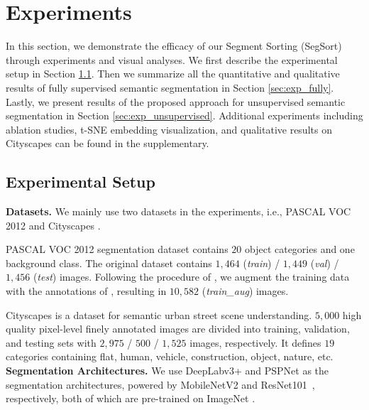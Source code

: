 \documentclass[10pt,twocolumn,letterpaper]{article}
\begin{document}
\section{Experiments}
\label{sec:exp}


In this section, we demonstrate the efficacy of our Segment Sorting (SegSort) through experiments and visual analyses. We first describe the experimental setup in Section \ref{sec:exp_setup}. Then we summarize all the quantitative and qualitative results of fully supervised semantic segmentation in Section \ref{sec:exp_fully}. Lastly, we present results of the proposed approach for unsupervised semantic segmentation in Section \ref{sec:exp_unsupervised}. Additional experiments including ablation studies, t-SNE embedding visualization, and qualitative results on Cityscapes can be found in the supplementary.


\subsection{Experimental Setup}
\label{sec:exp_setup}

\noindent \textbf{Datasets.} We mainly use two datasets in the experiments, i.e., 
PASCAL VOC 2012 \cite{pascal-voc-2012} and Cityscapes \cite{cordts2016cityscapes}. 

PASCAL VOC 2012 \cite{pascal-voc-2012} segmentation dataset contains $20$ object categories and one background class. The original dataset contains $1,464$ ({\it train}) / $1,449$ ({\it val}) / $1,456$ ({\it test}) images.  Following the procedure of \cite{long2015fully, chen2016deeplab,zhao2016pyramid}, we augment the training data with the annotations of \cite{hariharan2011semantic}, resulting in $10,582$ ({\it train\_aug}) images. 

Cityscapes \cite{cordts2016cityscapes} is a dataset for semantic urban street scene understanding.  $5,000$ high quality pixel-level finely annotated images are divided into  training, validation, and testing sets with $2,975$ / $500$ / $1,525$ images, respectively. It defines $19$ categories containing flat, human, vehicle, construction, object, nature, etc. \\

\vspace{-6pt}
\noindent \textbf{Segmentation Architectures.} We use DeepLabv3+ \cite{deeplabv3plus2018} and PSPNet \cite{zhao2016pyramid} as the segmentation architectures, powered by MobileNetV2 \cite{mobilenetv22018} and ResNet101~\cite{he2016deep}, respectively, both of which are pre-trained on ImageNet \cite{krizhevsky2012imagenet}.
\end{document}
